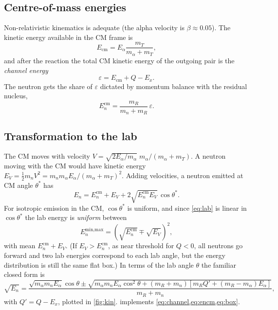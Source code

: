 \subsection{Centre-of-mass energies}
Non-relativistic kinematics is adequate (the alpha velocity is $\beta\approx0.05$). The kinetic energy available in the CM frame is
\begin{equation}
E_\text{cm} = E_\alpha \frac{m_T}{m_\alpha + m_T},
\end{equation}
and after the reaction the total CM kinetic energy of the outgoing pair is the \emph{channel energy}
\begin{equation}
\varepsilon = E_\text{cm} + Q - E_x .
\label{eq:channel}
\end{equation}
The neutron gets the share of $\varepsilon$ dictated by momentum balance with the residual nucleus,
\begin{equation}
E_n^\text{cm} = \frac{m_R}{m_n + m_R}\,\varepsilon .
\label{eq:encm}
\end{equation}
\subsection{Transformation to the lab}
The CM moves with velocity $V = \sqrt{2E_\alpha/m_\alpha}\;m_\alpha/(m_\alpha+m_T)$. A neutron moving with the CM would have kinetic energy $E_V = \tfrac12 m_n V^2 = m_n m_\alpha E_\alpha/(m_\alpha + m_T)^2$. Adding velocities, a neutron emitted at CM angle $\theta^*$ has
\begin{equation}
E_n = E_n^\text{cm} + E_V + 2\sqrt{E_n^\text{cm} E_V}\,\cos\theta^* .
\label{eq:lab}
\end{equation}
For isotropic emission in the CM, $\cos\theta^*$ is uniform, and since \cref{eq:lab} is linear in $\cos\theta^*$ the lab energy is \emph{uniform} between
\begin{equation}
E_n^\text{min,max} = \left(\sqrt{E_n^\text{cm}} \mp \sqrt{E_V}\right)^2 ,
\label{eq:box}
\end{equation}
with mean $E_n^\text{cm} + E_V$. (If $E_V > E_n^\text{cm}$, as near threshold for $Q<0$, all neutrons go forward and two lab energies correspond to each lab angle, but the energy distribution is still the same flat box.) In terms of the lab angle $\theta$ the familiar closed form is
\begin{equation}
\sqrt{E_n} = \frac{\sqrt{m_\alpha m_n E_\alpha}\cos\theta \pm \sqrt{m_\alpha m_n E_\alpha \cos^2\theta + (m_R + m_n)\left[m_R Q' + (m_R - m_\alpha)E_\alpha\right]}}{m_R + m_n},
\label{eq:angle}
\end{equation}
with $Q' = Q - E_x$, plotted in \cref{fig:kin}.  implements \cref{eq:channel,eq:encm,eq:box}.


